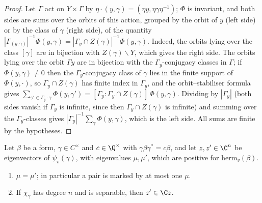 \begin{proof}
Let $\Gamma$ act on $Y\times\Gamma$ by $\eta\cdot(y,\gamma)=(\eta y,\eta\gamma\eta^{-1})$; $\Phi$ is invariant, and both sides
are sums over the orbits of this action, grouped by the orbit of $y$ (left side) or by the class of $\gamma$ (right side),
of the quantity $|\Gamma_{(y,\gamma)}|^{-1}\Phi(y,\gamma)=|\Gamma_y\cap Z(\gamma)|^{-1}\Phi(y,\gamma)$. Indeed, the orbits lying over
the class $[\gamma]$ are in bijection with $Z(\gamma)\backslash Y$, which gives the right side. The orbits lying over the
orbit $\Gamma y$ are in bijection with the $\Gamma_y$-conjugacy classes in $\Gamma$; if $\Phi(y,\gamma)\neq0$ then the
$\Gamma_y$-conjugacy class of $\gamma$ lies in the finite support of $\Phi(y,\cdot)$, so $\Gamma_y\cap Z(\gamma)$ has finite
index in $\Gamma_y$, and the orbit--stabiliser formula gives
$\sum_{\gamma'\in\Gamma_y\cdot\gamma}\Phi(y,\gamma')=[\Gamma_y:\Gamma_y\cap Z(\gamma)]\,\Phi(y,\gamma)$. Dividing by $|\Gamma_y|$ (both
sides vanish if $\Gamma_y$ is infinite, since then $\Gamma_y\cap Z(\gamma)$ is infinite) and summing over the
$\Gamma_y$-classes gives $|\Gamma_y|^{-1}\sum_{\gamma}\Phi(y,\gamma)$, which is the left side. All sums are finite by the hypotheses.
\end{proof}

\begin{lemma}\label{pf:ks1:lem-markuniq}
Let $\beta$ be a form, $\gamma\in C^\times$ and $c\in\Q^\times$ with $\gamma\beta\gamma^*=c\beta$, and let $z,z'\in\C^n$ be eigenvectors of
$\psi_v(\gamma)$, with eigenvalues $\mu,\mu'$, which are positive for $\mathrm{herm}_v(\beta)$.
\begin{enumerate}
\item $\mu=\mu'$; in particular a pair is marked by at most one $\mu$.
\item If $\chi_\gamma$ has degree $n$ and is separable, then $z'\in\C z$.
\end{enumerate}
\end{lemma}

